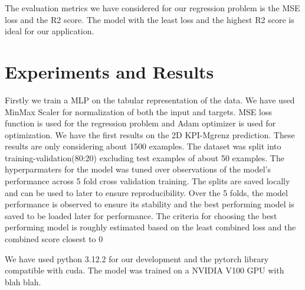 \documentclass{report} %
\begin{document}
The evaluation metrics we have considered for our regression problem is the MSE loss and the R2 score.
The model with the least loss and the highest R2 score is ideal for our application.

\newpage 

\chapter*{Experiments and Results}
Firstly we train a MLP on the tabular representation of the data.
We have used MinMax Scaler for normalization of both the input and targets.
MSE loss function is used for the regression problem and Adam optimizer is used for optimization.
We have the first results on the 2D KPI-Mgrenz prediction.
These results are only considering about 1500 examples. The dataset was split into training-validation(80:20) excluding test examples of about 50 examples.
The hyperparmaters for the model was tuned over observations of the model's performance across 5 fold cross validation training.
The splits are saved locally and can be used to later to ensure reproducibility.
Over the 5 folds, the model performance is observed to ensure its stability and the best performing model is saved to be loaded later for performance.
The criteria for choosing the best performing model is roughly estimated based on the least combined loss and the combined score closest to 0

We have used python 3.12.2 for our development and the pytorch library compatible with cuda.
The model was trained on a NVIDIA V100 GPU with blah blah.
\end{document}
